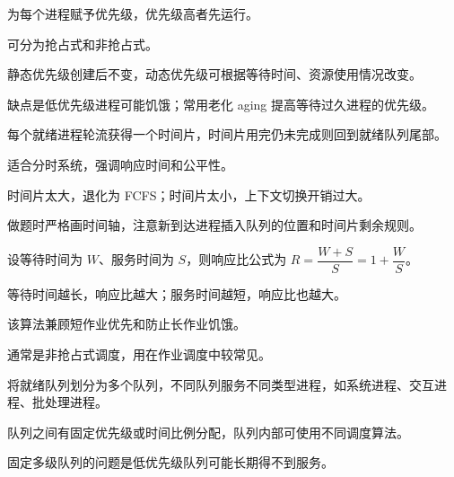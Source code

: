 \begin{points}
  \item 为每个进程赋予优先级，优先级高者先运行。
  \item 可分为抢占式和非抢占式。
  \item 静态优先级创建后不变，动态优先级可根据等待时间、资源使用情况改变。
  \item 缺点是低优先级进程可能饥饿；常用老化 aging 提高等待过久进程的优先级。
\end{points}


\begin{points}
  \item 每个就绪进程轮流获得一个时间片，时间片用完仍未完成则回到就绪队列尾部。
  \item 适合分时系统，强调响应时间和公平性。
  \item 时间片太大，退化为 FCFS；时间片太小，上下文切换开销过大。
  \item 做题时严格画时间轴，注意新到达进程插入队列的位置和时间片剩余规则。
\end{points}


\begin{points}
  \item 设等待时间为 $W$、服务时间为 $S$，则响应比公式为 $R=\dfrac{W+S}{S}=1+\dfrac{W}{S}$。
  \item 等待时间越长，响应比越大；服务时间越短，响应比也越大。
  \item 该算法兼顾短作业优先和防止长作业饥饿。
  \item 通常是非抢占式调度，用在作业调度中较常见。
\end{points}


\begin{points}
  \item 将就绪队列划分为多个队列，不同队列服务不同类型进程，如系统进程、交互进程、批处理进程。
  \item 队列之间有固定优先级或时间比例分配，队列内部可使用不同调度算法。
  \item 固定多级队列的问题是低优先级队列可能长期得不到服务。
\end{points}


